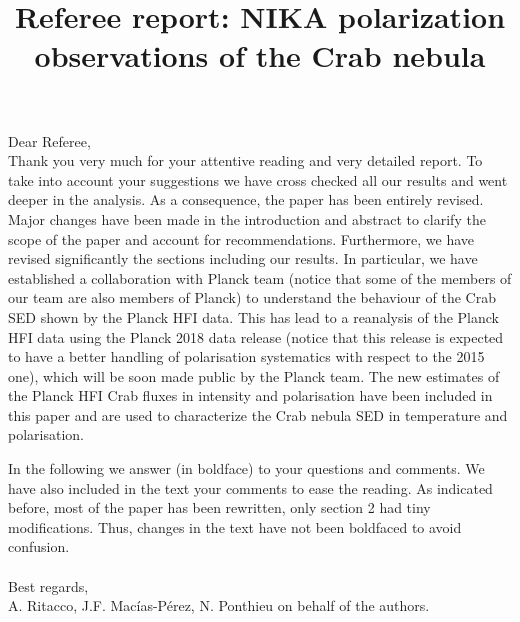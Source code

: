 \documentclass[12pt]{article}
\title{Referee report: NIKA polarization observations of the Crab nebula}
\begin{document}
\maketitle

\noindent Dear Referee,\\

Thank you very much for your attentive reading and very detailed report. 
To take into account your suggestions we have cross checked all our results
and went deeper in the analysis.
As a consequence, the paper has been entirely revised. Major changes have been made in the introduction and abstract to clarify the scope of the paper and account for
recommendations. Furthermore, we have revised significantly the sections including our results. In particular, we have established a collaboration with 
Planck team (notice that some of the members of our team are also members of Planck) to understand the behaviour of the Crab SED shown by the Planck HFI data. This has lead to a reanalysis of the Planck HFI data using the Planck 2018 data release (notice that this release is expected to have a better handling of polarisation systematics with respect to the 2015 one), which will be soon made public by the Planck team.  The new estimates of the Planck HFI Crab fluxes in intensity and polarisation have been included in this paper and are used to characterize
the Crab nebula SED in temperature and polarisation.

In the following we answer (in boldface) to your questions and comments. 
We have also included in the text your comments to ease the reading.
As indicated before, most of the paper has been rewritten, only section 2 had tiny modifications. Thus, changes in the text have not been boldfaced to avoid confusion. \\  \\
Best regards,\\
A. Ritacco, J.F. Macías-Pérez, N. Ponthieu on behalf of the authors.
\end{document}
